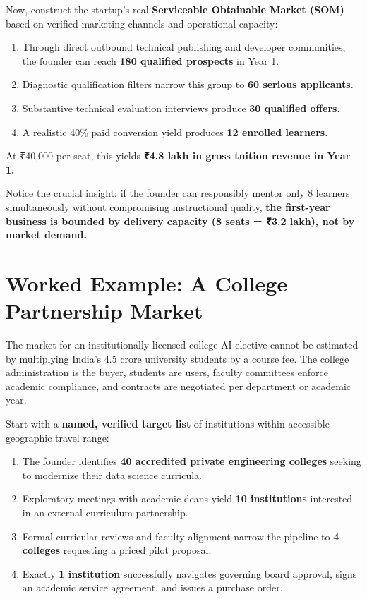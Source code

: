Now, construct the startup's real \textbf{Serviceable Obtainable Market (SOM)} based on verified marketing channels and operational capacity:
\begin{enumerate}[leftmargin=12pt,itemsep=1pt,topsep=1pt,parsep=0pt]
  \item Through direct outbound technical publishing and developer communities, the founder can reach \textbf{180 qualified prospects} in Year 1.
  \item Diagnostic qualification filters narrow this group to \textbf{60 serious applicants}.
  \item Substantive technical evaluation interviews produce \textbf{30 qualified offers}.
  \item A realistic 40\% paid conversion yield produces \textbf{12 enrolled learners}.
\end{enumerate}

At ₹40,000 per seat, this yields \textbf{₹4.8 lakh in gross tuition revenue in Year 1.}

Notice the crucial insight: if the founder can responsibly mentor only 8 learners simultaneously without compromising instructional quality, \textbf{the first-year business is bounded by delivery capacity (8 seats = ₹3.2 lakh), not by market demand.}

\section{Worked Example: A College Partnership Market}

The market for an institutionally licensed college AI elective cannot be estimated by multiplying India's 4.5 crore university students by a course fee. The college administration is the buyer, students are users, faculty committees enforce academic compliance, and contracts are negotiated per department or academic year.

Start with a \textbf{named, verified target list} of institutions within accessible geographic travel range:
\begin{enumerate}[leftmargin=12pt,itemsep=1pt,topsep=1pt,parsep=0pt]
  \item The founder identifies \textbf{40 accredited private engineering colleges} seeking to modernize their data science curricula.
  \item Exploratory meetings with academic deans yield \textbf{10 institutions} interested in an external curriculum partnership.
  \item Formal curricular reviews and faculty alignment narrow the pipeline to \textbf{4 colleges} requesting a priced pilot proposal.
  \item Exactly \textbf{1 institution} successfully navigates governing board approval, signs an academic service agreement, and issues a purchase order.
\end{enumerate}

